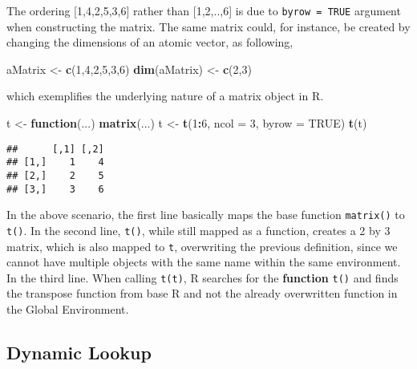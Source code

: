 \documentclass[12,]{article}
\newenvironment{Shaded}{\begin{snugshade}}{\end{snugshade}}
\newcommand{\KeywordTok}[1]{\textcolor[rgb]{0.13,0.29,0.53}{\textbf{#1}}}
\newcommand{\DataTypeTok}[1]{\textcolor[rgb]{0.13,0.29,0.53}{#1}}
\newcommand{\DecValTok}[1]{\textcolor[rgb]{0.00,0.00,0.81}{#1}}
\newcommand{\StringTok}[1]{\textcolor[rgb]{0.31,0.60,0.02}{#1}}
\newcommand{\OtherTok}[1]{\textcolor[rgb]{0.56,0.35,0.01}{#1}}
\newcommand{\ControlFlowTok}[1]{\textcolor[rgb]{0.13,0.29,0.53}{\textbf{#1}}}
\newcommand{\OperatorTok}[1]{\textcolor[rgb]{0.81,0.36,0.00}{\textbf{#1}}}
\newcommand{\NormalTok}[1]{#1}
\begin{document}
The ordering {[}1,4,2,5,3,6{]} rather than {[}1,2,..,6{]} is due to
\texttt{byrow\ =\ TRUE} argument when constructing the matrix. The same
matrix could, for instance, be created by changing the dimensions of an
atomic vector, as following,

\begin{Shaded}
\begin{Highlighting}[]
\NormalTok{aMatrix <-}\StringTok{ }\KeywordTok{c}\NormalTok{(}\DecValTok{1}\NormalTok{,}\DecValTok{4}\NormalTok{,}\DecValTok{2}\NormalTok{,}\DecValTok{5}\NormalTok{,}\DecValTok{3}\NormalTok{,}\DecValTok{6}\NormalTok{)}
\KeywordTok{dim}\NormalTok{(aMatrix) <-}\StringTok{ }\KeywordTok{c}\NormalTok{(}\DecValTok{2}\NormalTok{,}\DecValTok{3}\NormalTok{)}
\end{Highlighting}
\end{Shaded}

which exemplifies the underlying nature of a matrix object in R.

\pagebreak

\begin{Shaded}
\begin{Highlighting}[]
\NormalTok{t <-}\StringTok{ }\ControlFlowTok{function}\NormalTok{(...) }\KeywordTok{matrix}\NormalTok{(...)}
\NormalTok{t <-}\StringTok{ }\KeywordTok{t}\NormalTok{(}\DecValTok{1}\OperatorTok{:}\DecValTok{6}\NormalTok{, }\DataTypeTok{ncol =} \DecValTok{3}\NormalTok{, }\DataTypeTok{byrow =} \OtherTok{TRUE}\NormalTok{) }
\KeywordTok{t}\NormalTok{(t)}
\end{Highlighting}
\end{Shaded}

\begin{verbatim}
##      [,1] [,2]
## [1,]    1    4
## [2,]    2    5
## [3,]    3    6
\end{verbatim}

In the above scenario, the first line basically maps the base function
\texttt{matrix()} to \texttt{t()}. In the second line, \texttt{t()},
while still mapped as a function, creates a 2 by 3 matrix, which is also
mapped to \texttt{t}, overwriting the previous definition, since we
cannot have multiple objects with the same name within the same
environment. In the third line. When calling \texttt{t(t)}, R searches
for the \textbf{function} \texttt{t()} and finds the transpose function
from base R and not the already overwritten function in the Global
Environment.

\subsection*{Dynamic Lookup}\label{dynamic-lookup}
\end{document}
